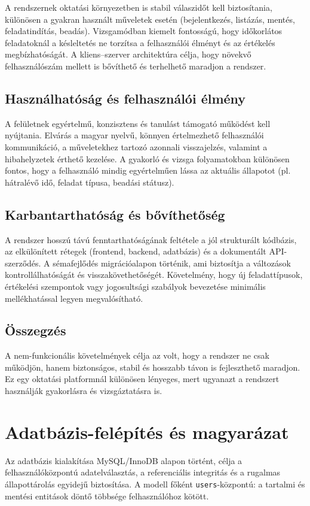 \documentclass{thesis-ekf}
\begin{document}
A rendszernek oktatási környezetben is stabil válaszidőt kell biztosítania, különösen a gyakran használt műveletek esetén (bejelentkezés, listázás, mentés, feladatindítás, beadás). Vizsgamódban kiemelt fontosságú, hogy időkorlátos feladatoknál a késleltetés ne torzítsa a felhasználói élményt és az értékelés megbízhatóságát. A kliens--szerver architektúra célja, hogy növekvő felhasználószám mellett is bővíthető és terhelhető maradjon a rendszer.

\subsection{Használhatóság és felhasználói élmény}

A felületnek egyértelmű, konzisztens és tanulást támogató működést kell nyújtania. Elvárás a magyar nyelvű, könnyen értelmezhető felhasználói kommunikáció, a műveletekhez tartozó azonnali visszajelzés, valamint a hibahelyzetek érthető kezelése. A gyakorló és vizsga folyamatokban különösen fontos, hogy a felhasználó mindig egyértelműen lássa az aktuális állapotot (pl. hátralévő idő, feladat típusa, beadási státusz).

\subsection{Karbantarthatóság és bővíthetőség}

A rendszer hosszú távú fenntarthatóságának feltétele a jól strukturált kódbázis, az elkülönített rétegek (frontend, backend, adatbázis) és a dokumentált API-szerződés. A sémafejlődés migrációalapon történik, ami biztosítja a változások kontrollálhatóságát és visszakövethetőségét. Követelmény, hogy új feladattípusok, értékelési szempontok vagy jogosultsági szabályok bevezetése minimális mellékhatással legyen megvalósítható.

\subsection{Összegzés}

A nem-funkcionális követelmények célja az volt, hogy a rendszer ne csak működjön, hanem biztonságos, stabil és hosszabb távon is fejleszthető maradjon. Ez egy oktatási platformnál különösen lényeges, mert ugyanazt a rendszert használják gyakorlásra és vizsgáztatásra is.

\section{Adatbázis-felépítés és magyarázat}
Az adatbázis kialakítása MySQL/InnoDB alapon \cite{mysql-docs} történt, célja a felhasználóközpontú adatelválasztás, a referenciális integritás és a rugalmas állapottárolás egyidejű biztosítása. A modell főként \texttt{users}-központú: a tartalmi és mentési entitások döntő többsége felhasználóhoz kötött.
\end{document}
